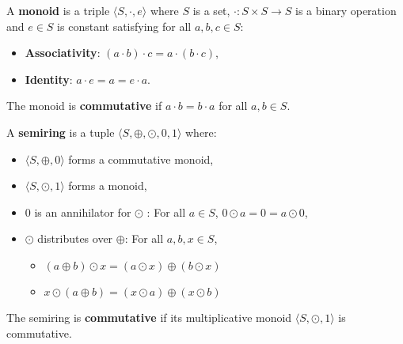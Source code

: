 \begin{definition}[Monoid]
    \label{def:monoid}
    A \textbf{monoid} is a triple \(\langle S, \cdot, e \rangle\) where \(S\) is a set, \(\cdot : S \times S \to S\) is a binary operation and \(e \in S\) is constant
    satisfying for all \(a, b, c \in S\):
    \begin{itemize}
        \item \textbf{Associativity}: \((a \cdot b) \cdot c = a \cdot (b \cdot c)\),
        \item \textbf{Identity}: \(a \cdot e = a = e \cdot a\).
    \end{itemize}
    The monoid is \textbf{commutative} if \(a \cdot b = b \cdot a\) for all \(a, b \in S\).
\end{definition} 

\begin{definition}[Semiring]
    \label{def:semiring}
    A \textbf{semiring} is a tuple \(\langle S, \oplus, \odot, 0, 1 \rangle\) where:
    \begin{itemize}
        \item  \(\langle S, \oplus, 0 \rangle\) forms a commutative monoid,
        \item  \(\langle S, \odot, 1 \rangle\) forms a monoid,
        \item  $0$ is an annihilator for $\odot$ : For all \(a \in S\),
              \(
                  0 \odot a = 0 = a \odot 0
              \),
        \item $\odot$ distributes over $\oplus$: For all \(a, b, x \in S\),
              \begin{itemize}
                \item $(a \oplus b) \odot x = (a \odot x) \oplus (b \odot x)$
                \item $x \odot (a \oplus b) = (x \odot a) \oplus (x \odot b)$
              \end{itemize}                 
    \end{itemize}
    The semiring is \textbf{commutative} if its multiplicative monoid \(\langle S, \odot, 1 \rangle\) is commutative.
\end{definition}


